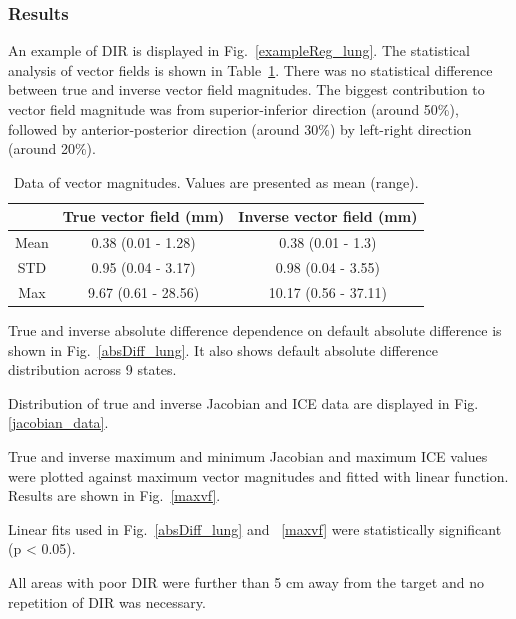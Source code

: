 \documentclass[type=dr, dr=rernat, accentcolor=tud7b,colorbacktitle, bigchapter, openright, twoside, 12pt ]{tudthesis}
\begin{document}
\subsubsection{Results}

An example of DIR is displayed in Fig.~\ref{exampleReg_lung}. The statistical analysis of vector fields is shown in Table~\ref{tab:vectordata_lung}. There was no statistical
difference between true and inverse vector field magnitudes. The biggest contribution to vector field magnitude was from superior-inferior direction (around 50\%), followed by anterior-posterior direction (around 30\%)
by left-right direction (around 20\%).

\begin{table}[H]
  \centering
  \caption{Data of vector magnitudes. Values are presented as mean (range).}
  \begin{tabular}{c|c|c}
  
       & True vector field (mm) & Inverse vector field (mm) \\
       \hline
       Mean & 0.38 (0.01 - 1.28) & 0.38 (0.01 - 1.3) \\ 
       STD & 0.95 (0.04 - 3.17) & 0.98 (0.04 - 3.55) \\ 
       Max & 9.67 (0.61 - 28.56) & 10.17 (0.56 - 37.11) \\
    \hline\hline
  \end{tabular}
  \label{tab:vectordata_lung}
\end{table}

True and inverse absolute difference dependence on default absolute difference is shown in Fig.~\ref{absDiff_lung}. It also shows default absolute difference distribution across 9 states. 

Distribution of true and inverse Jacobian and ICE data are displayed in Fig. \ref{jacobian_data}. 

True and inverse maximum and minimum Jacobian and maximum ICE values were plotted against maximum vector magnitudes and fitted with linear function. Results are shown in Fig.~\ref{maxvf}.


Linear fits used in Fig.~\ref{absDiff_lung} and ~\ref{maxvf} were statistically significant (p < 0.05).

All areas with poor DIR were further than 5 cm away from the target and no repetition of DIR was necessary.
\end{document}
